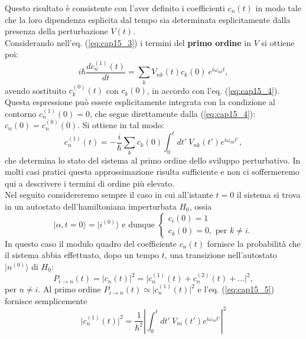 Questo risultato è consistente con l'aver definito i coefficienti $c_n (t)$ in modo tale che la loro dipendenza esplicita dal tempo sia determinata esplicitamente dalla presenza della perturbazione $V(t)$.\\
Considerando nell'eq. (\ref{eq:cap15_3}) i termini del \textbf{primo ordine} in $V$ si ottiene poi:
\begin{equation}
i\hbar \frac{d c_n ^{(1)}(t)}{dt}=\sum _k V_{nk} (t) c_k (0)\ e^{i\omega _{nk} t}  ,
\end{equation}
avendo sostituito $c_k ^{(0)} (t)$ con $c_k (0)$, in accordo con l'eq. (\ref{eq:cap15_4}). Questa espressione può essere esplicitamente integrata con la condizione al contorno $ c_n ^{(1)} (0) =0$, che segue direttamente dalla (\ref{eq:cap15_4}): $c_n (0) = c_n ^{(0)} (0)$. Si ottiene in tal modo:
\begin{equation}
c_n ^{(1)} (t) = -\frac{i}{\hbar} \sum _k c_k (0) \int _0 ^t dt'\ V_{nk} (t') e ^{i \omega _{nk} t'} ,
\label{eq:cap15_5}
\end{equation}
che determina lo stato del sistema al primo ordine dello sviluppo perturbativo. In molti casi pratici questa approssimazione risulta sufficiente e non ci soffermeremo qui a descrivere i termini di ordine più elevato.\\
Nel seguito considereremo sempre il caso in cui all'istante $t=0$ il sistema si trova in un autostato dell'hamiltoniana imperturbata $H_0$, ossia
\begin{equation}
\vert \alpha , t=0\rangle = \vert i ^{(0)} \rangle \textrm{ e dunque } 
 \begin{cases}
   c_i (0)=1\\c_k (0)=0, \textrm{ per }k\neq i.
   \end{cases}
\end{equation}
In questo caso il modulo quadro del coefficiente $c_n (t)$ fornisce la probabilità che il sistema abbia effettuato, dopo un tempo $t$, una transizione nell'autostato $\vert n^{(0)} \rangle $ di $H_0$:
\begin{equation}
P_{i\rightarrow n} (t) = \vert c_n (t) \vert ^2 = \vert c_n ^{(1)}(t)+c_n ^{(2)}(t)+\dots \vert ^2 ,
\end{equation}
per $n \neq i$. Al primo ordine $P_{i\rightarrow n} (t) \simeq \vert c_n  ^{(1)}(t) \vert ^2$ e l'eq. (\ref{eq:cap15_5}) fornisce semplicemente
\begin{equation}
\vert c_n  ^{(1)}(t) \vert ^2 = \frac{1}{\hbar ^2}\left\vert \int _0 ^t dt'\ V_{ni} (t') e ^{i \omega _{ni} t'} \right\vert ^2
\end{equation}
